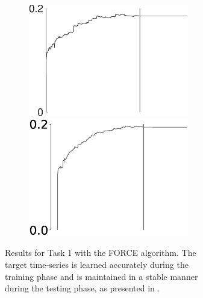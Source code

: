 \begin{figure}
\begin{subfigure}{\textwidth}
\begin{subfigure}{\textwidth}
        \includegraphics[trim=0cm 0cm 1cm 0cm, clip=true,height=0.12\linewidth,width=.45\linewidth]{Figures/Fig_T1/MATLAB/FORCE_T1_W_norm.eps}
        \hspace{.3em}
        \includegraphics[trim=0cm 0cm 1cm 0cm, clip=true,height=0.12\linewidth,width=.45\linewidth]{Figures/Fig_T1/Python/FORCE_T1_W_norm.eps}
        
        \end{subfigure}
        

    \caption{Results for Task 1 with the FORCE algorithm. The target time‐series is learned accurately during the training phase and is maintained in a stable manner during the testing phase, as presented in \cite{pyle2019}.}
    \label{Fig:compTask1FORCE_MSE}
    \end{subfigure}

    \begin{subfigure}{\textwidth}
        \centering
        
        \textbf{}\begin{subfigure}{\textwidth}
        \centering
        

\end{subfigure}
\end{subfigure}
\end{figure}
